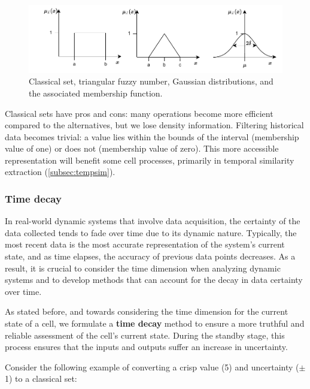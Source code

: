 \begin{figure}[h!]
    \centering
    \includegraphics[width=15cm]{figures/chapter4/cell/classic_fuzzy_gaussian.pdf}
    \caption{Classical set, triangular fuzzy number, Gaussian distributions, and the associated membership function.}
    \label{fig:classicfuzzygaussian}
\end{figure}

Classical sets have pros and cons: many operations become more efficient compared to the alternatives, but we lose density information. Filtering historical data becomes trivial: a value lies within the bounds of the interval (membership value of one) or does not (membership value of zero). This more accessible representation will benefit some cell processes, primarily in temporal similarity extraction (\ref{subsec:tempsim}).

\subsubsection{Time decay} \label{subsec:timedecay}

In real-world dynamic systems that involve data acquisition, the certainty of the data collected tends to fade over time due to its dynamic nature. Typically, the most recent data is the most accurate representation of the system's current state, and as time elapses, the accuracy of previous data points decreases. As a result, it is crucial to consider the time dimension when analyzing dynamic systems and to develop methods that can account for the decay in data certainty over time.

As stated before, and towards considering the time dimension for the current state of a cell, we formulate a \textbf{time decay} method to ensure a more truthful and reliable assessment of the cell's current state. During the standby stage, this process ensures that the inputs and outputs suffer an increase in uncertainty.

Consider the following example of converting a crisp value (5) and uncertainty ($\pm$1) to a classical set:

